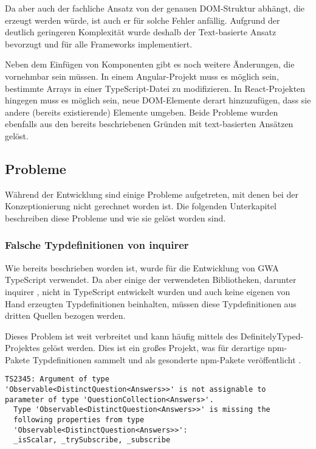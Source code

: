 Da aber auch der fachliche Ansatz von der genauen \gls{DOM}-Struktur abhängt, die erzeugt werden würde, ist auch er für solche Fehler anfällig. Aufgrund der deutlich geringeren Komplexität wurde deshalb der Text-basierte Ansatz bevorzugt und für alle Frameworks implementiert.

Neben dem Einfügen von Komponenten gibt es noch weitere Änderungen, die vornehmbar sein müssen. In einem Angular-Projekt muss es möglich sein, bestimmte Arrays in einer TypeScript-Datei zu modifizieren. In React-Projekten hingegen muss es möglich sein, neue \gls{DOM}-Elemente derart hinzuzufügen, dass sie andere (bereits existierende) Elemente umgeben. Beide Probleme wurden ebenfalls aus den bereits beschriebenen Gründen mit text-basierten Ansätzen gelöst.

\subsection{Probleme}
Während der Entwicklung sind einige Probleme aufgetreten, mit denen bei der Konzeptionierung nicht gerechnet worden ist. Die folgenden Unterkapitel beschreiben diese Probleme und wie sie gelöst worden sind.

\subsubsection{Falsche Typdefinitionen von inquirer}
Wie bereits beschrieben worden ist, wurde für die Entwicklung von \gls{GWA} TypeScript verwendet. Da aber einige der verwendeten Bibliotheken, darunter inquirer \cite{inquirer_package_json}, nicht in TypeScript entwickelt wurden und auch keine eigenen von Hand erzeugten Typdefinitionen beinhalten, müssen diese Typdefinitionen aus dritten Quellen bezogen werden.

Dieses Problem ist weit verbreitet und kann häufig mittels des DefinitelyTyped-Projektes gelöst werden. Dies ist ein großes Projekt, was für derartige \gls{npm}-Pakete Typdefinitionen sammelt und als gesonderte \gls{npm}-Pakete veröffentlicht \cite{DT_github}.

\begin{lstlisting}[caption={TypeScript-Fehlermeldung bei der Verwendung von inquirer mit einem RxJS-Observable}, captionpos=b, label={code:inquirer_ts_error}]
TS2345: Argument of type
'Observable<DistinctQuestion<Answers>>' is not assignable to
parameter of type 'QuestionCollection<Answers>'.
  Type 'Observable<DistinctQuestion<Answers>>' is missing the
  following properties from type
  'Observable<DistinctQuestion<Answers>>':
  _isScalar, _trySubscribe, _subscribe
\end{lstlisting}

